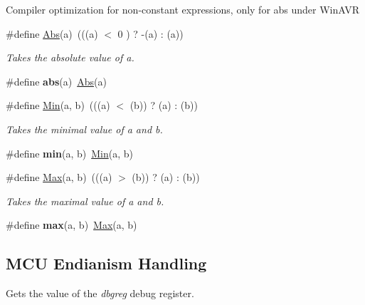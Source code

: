  Compiler optimization for non-\/constant expressions, only for abs under Win\-A\-V\-R \begin{DoxyCompactItemize}
\item 
\#define \hyperlink{group__group__xmega__utils_gae56b0282c58a65969c092e1eeeedd6f5}{Abs}(a)~(((a) $<$  0 ) ? -\/(a) \-: (a))
\begin{DoxyCompactList}\small\item\em Takes the absolute value of {\itshape a}. \end{DoxyCompactList}\item 
\hypertarget{group__group__xmega__utils_ga6a010865b10e541735fa2da8f3cd062d}{\#define {\bfseries abs}(a)~\hyperlink{group__group__xmega__utils_gae56b0282c58a65969c092e1eeeedd6f5}{Abs}(a)}\label{group__group__xmega__utils_ga6a010865b10e541735fa2da8f3cd062d}

\item 
\#define \hyperlink{group__group__xmega__utils_ga9e04209162ea72f9985338596262b657}{Min}(a, b)~(((a) $<$ (b)) ?  (a) \-: (b))
\begin{DoxyCompactList}\small\item\em Takes the minimal value of {\itshape a} and {\itshape b}. \end{DoxyCompactList}\item 
\hypertarget{group__group__xmega__utils_gac6afabdc09a49a433ee19d8a9486056d}{\#define {\bfseries min}(a, b)~\hyperlink{group__group__xmega__utils_ga9e04209162ea72f9985338596262b657}{Min}(a, b)}\label{group__group__xmega__utils_gac6afabdc09a49a433ee19d8a9486056d}

\item 
\#define \hyperlink{group__group__xmega__utils_ga4886a8f966a69949cefc46a6a3468006}{Max}(a, b)~(((a) $>$ (b)) ?  (a) \-: (b))
\begin{DoxyCompactList}\small\item\em Takes the maximal value of {\itshape a} and {\itshape b}. \end{DoxyCompactList}\item 
\hypertarget{group__group__xmega__utils_gaffe776513b24d84b39af8ab0930fef7f}{\#define {\bfseries max}(a, b)~\hyperlink{group__group__xmega__utils_ga4886a8f966a69949cefc46a6a3468006}{Max}(a, b)}\label{group__group__xmega__utils_gaffe776513b24d84b39af8ab0930fef7f}

\end{DoxyCompactItemize}
\subsection*{M\-C\-U Endianism Handling}
\label{_amgrpc36c0117ea92446a6a59adb04c50c165}%
Gets the value of the {\itshape dbgreg} debug register.


